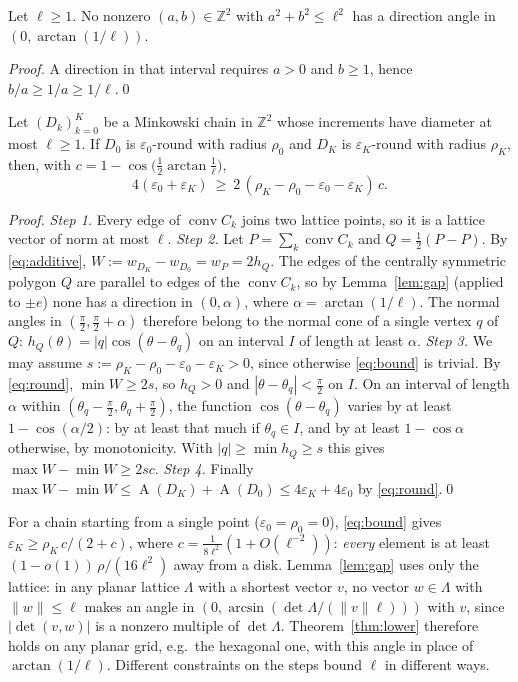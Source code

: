 \documentclass[runningheads]{llncs}
\newcommand{\Z}{\mathbb{Z}}
\newcommand{\conv}{\operatorname{conv}}
\newcommand{\A}{\operatorname{A}}
\begin{document}
\begin{lemma}\label{lem:gap}
Let $\ell\ge1$. No nonzero $(a,b)\in\Z^2$ with $a^2+b^2\le \ell^2$ has a direction angle in $(0,\arctan(1/\ell))$.
\end{lemma}
\begin{proof}
A direction in that interval requires $a>0$ and $b\ge1$, hence $b/a\ge1/a\ge1/\ell$.\qed
\end{proof}

\begin{theorem}\label{thm:lower}
Let $(D_k)_{k=0}^K$ be a Minkowski chain in $\Z^2$ whose increments have diameter at most $\ell\ge1$. If $D_0$ is $\varepsilon_0$-round with radius $\rho_0$ and $D_K$ is $\varepsilon_K$-round with radius $\rho_K$, then, with $c=1-\cos\bigl(\frac12\arctan\frac1\ell\bigr)$,
\begin{equation}\label{eq:bound}
4(\varepsilon_0+\varepsilon_K)\ \ge\ 2\,(\rho_K-\rho_0-\varepsilon_0-\varepsilon_K)\,c .
\end{equation}
\end{theorem}
\begin{proof}
\emph{Step 1.} Every edge of $\conv C_k$ joins two lattice points, so it is a lattice vector of norm at most $\ell$.
\emph{Step 2.} Let $P=\sum_k\conv C_k$ and $Q=\frac12(P-P)$. By \eqref{eq:additive}, $W:=w_{D_K}-w_{D_0}=w_P=2h_Q$. The edges of the centrally symmetric polygon $Q$ are parallel to edges of the $\conv C_k$, so by Lemma~\ref{lem:gap} (applied to $\pm e$) none has a direction in $(0,\alpha)$, where $\alpha=\arctan(1/\ell)$. The normal angles in $(\frac\pi2,\frac\pi2+\alpha)$ therefore belong to the normal cone of a single vertex $q$ of $Q$: $h_Q(\theta)=|q|\cos(\theta-\theta_q)$ on an interval $I$ of length at least $\alpha$.
\emph{Step 3.} We may assume $s:=\rho_K-\rho_0-\varepsilon_0-\varepsilon_K>0$, since otherwise \eqref{eq:bound} is trivial. By \eqref{eq:round}, $\min W\ge2s$, so $h_Q>0$ and $|\theta-\theta_q|<\frac\pi2$ on $I$. On an interval of length $\alpha$ within $(\theta_q-\frac\pi2,\theta_q+\frac\pi2)$, the function $\cos(\theta-\theta_q)$ varies by at least $1-\cos(\alpha/2)$: by at least that much if $\theta_q\in I$, and by at least $1-\cos\alpha$ otherwise, by monotonicity. With $|q|\ge\min h_Q\ge s$ this gives $\max W-\min W\ge2sc$.
\emph{Step 4.} Finally $\max W-\min W\le\A(D_K)+\A(D_0)\le4\varepsilon_K+4\varepsilon_0$ by \eqref{eq:round}.\qed
\end{proof}

For a chain starting from a single point ($\varepsilon_0=\rho_0=0$), \eqref{eq:bound} gives $\varepsilon_K\ge\rho_K\,c/(2+c)$, where $c=\frac{1}{8\ell^2}(1+O(\ell^{-2}))$: \emph{every} element is at least $(1-o(1))\,\rho/(16\ell^2)$ away from a disk. Lemma~\ref{lem:gap} uses only the lattice: in any planar lattice $\Lambda$ with a shortest vector $v$, no vector $w\in\Lambda$ with $\|w\|\le\ell$ makes an angle in $(0,\arcsin(\det\Lambda/(\|v\|\ell)))$ with $v$, since $|\det(v,w)|$ is a nonzero multiple of $\det\Lambda$. Theorem~\ref{thm:lower} therefore holds on any planar grid, e.g.\ the hexagonal one, with this angle in place of $\arctan(1/\ell)$. Different constraints on the steps bound $\ell$ in different ways.
\end{document}
